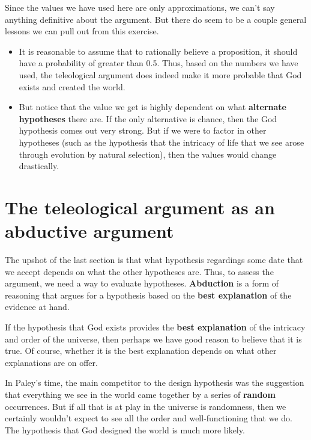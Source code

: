 \documentclass[letterpaper,10pt]{article}
\begin{document}
Since the values we have used here are only approximations, we can't say anything definitive about the argument.  But there do seem to be a couple general lessons we can pull out from this exercise.
\begin{itemize}
 \item It is reasonable to assume that to rationally believe a proposition, it should have a probability of greater than 0.5. Thus, based on the numbers we have used, the teleological argument does indeed make it more probable that God exists and created the world.
 \item But notice that the value we get is highly dependent on what \textbf{alternate hypotheses} there are.  If the only alternative is chance, then the God hypothesis comes out very strong. But if we were to factor in other hypotheses (such as the hypothesis that the intricacy of life that we see arose through evolution by natural selection), then the values would change drastically.
\end{itemize}

\section{The teleological argument as an abductive argument}
The upshot of the last section is that what hypothesis regardings some date that we accept depends on what the other hypotheses are.  Thus, to assess the argument, we need a way to evaluate hypotheses.  \textbf{Abduction} is a form of reasoning that argues for a hypothesis based on the \textbf{best explanation} of the evidence at hand.

If the hypothesis that God exists provides the \textbf{best explanation} of the intricacy and order of the universe, then perhaps we have good reason to believe that it is true. Of course, whether it is the best explanation depends on what other explanations are on offer.

In Paley's time, the main competitor to the design hypothesis was the suggestion that everything we see in the world came together by a series of \textbf{random} occurrences. But if all that is at play in the universe is randomness, then we certainly wouldn't expect to see all the order and well-functioning that we do.  The hypothesis that God designed the world is much more likely.
\end{document}
